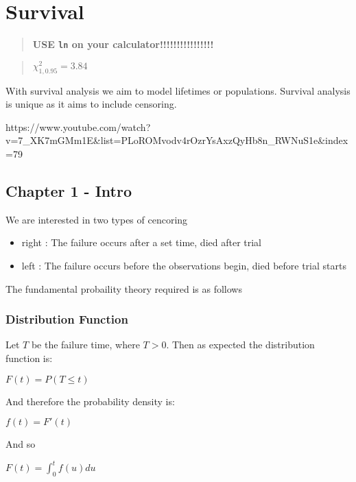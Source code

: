 \documentclass[
  letterpaper,
  DIV=11,
  numbers=noendperiod]{scrreprt}
\providecommand{\tightlist}{%
  \setlength{\itemsep}{0pt}\setlength{\parskip}{0pt}}\usepackage{longtable,booktabs,array}
\begin{document}

\hypertarget{survival}{%
\chapter{Survival}\label{survival}}

\begin{quote}
\textbf{USE \texttt{ln} on your calculator!!!!!!!!!!!!!!!!}
\end{quote}

\begin{quote}
\(\chi^2_{1, 0.95} = 3.84\)
\end{quote}

With survival analysis we aim to model lifetimes or populations.
Survival analysis is unique as it aims to include censoring.

https://www.youtube.com/watch?v=7\_XK7mGMm1E\&list=PLoROMvodv4rOzrYsAxzQyHb8n\_RWNuS1e\&index=79

\hypertarget{chapter-1---intro-1}{%
\section{Chapter 1 - Intro}\label{chapter-1---intro-1}}

We are interested in two types of cencoring

\begin{itemize}
\tightlist
\item
  right : The failure occurs after a set time, died after trial
\item
  left : The failure occurs before the observations begin, died before
  trial starts
\end{itemize}

The fundamental probaility theory required is as follows

\hypertarget{distribution-function}{%
\subsection{Distribution Function}\label{distribution-function}}

Let \(T\) be the failure time, where \(T>0\). Then as expected the
distribution function is:

\(F(t) = P(T\leq t)\)

And therefore the probability density is:

\(f(t) = F'(t)\)

And so

\(F(t) = \int_0^tf(u)du\)
\end{document}
